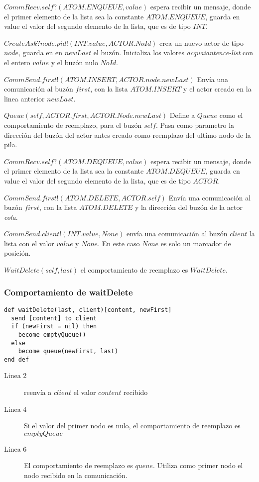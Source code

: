 \begin{description}
 \item $CommRecv.self?(ATOM.ENQUEUE, value)$ espera recibir un mensaje, donde el primer elemento de la lista sea la constante $ATOM.ENQUEUE$, guarda en value el valor del segundo elemento de la lista, que es de tipo $INT$.
 \item $CreateAsk?node.pid!(INT.value, ACTOR.NoId)$ crea un nuevo actor de tipo $node$, guarda en en $newLast$ el buzón. Inicializa los valores \textit{acquaiantence-list} con el entero $value$ y el buzón nulo $NoId$.
 \item $CommSend.first!(ATOM.INSERT, ACTOR.node.newLast)$ Envía una comunicación al buzón $first$, con la lista $ATOM.INSERT$ y el actor creado en la linea anterior $newLast$. 
 \item $Queue(self, ACTOR.first, ACTOR.Node.newLast)$ Define a $Queue$ como el comportamiento de reemplazo, para el buzón $self$. Pasa como parametro la dirección del buzón del actor antes creado como reemplazo del ultimo nodo de la pila.
 \item $CommRecv.self?(ATOM.DEQUEUE, value)$ espera recibir un mensaje, donde el primer elemento de la lista sea la constante $ATOM.DEQUEUE$, guarda en value el valor del segundo elemento de la lista, que es de tipo $ACTOR$.
 \item $CommSend.first!(ATOM.DELETE, ACTOR.self)$ Envía una comunicación al buzón $first$, con la lista $ATOM.DELETE$ y la dirección del buzón de la actor \textit{cola}. 
 \item $CommSend.client!(INT.value, None)$ envía una comunicación al buzón $client$ la lista con el valor $value$ y $None$. En este caso $None$ es solo un marcador de posición.
 \item $WaitDelete(self, last)$ el comportamiento de reemplazo es $WaitDelete$.
 \end{description}


\subsubsection*{Comportamiento de waitDelete}

\begin{lstlisting}[language=sal, style=simple]
def waitDelete(last, client)[content, newFirst]
  send [content] to client
  if (newFirst = nil) then
    become emptyQueue()
  else
    become queue(newFirst, last)
end def
\end{lstlisting}

\begin{description}
 \item [Linea 2] reenvía a $client$ el valor $content$ recibido
 \item [Linea 4] Si el valor del primer nodo es nulo, el comportamiento de reemplazo es $emptyQueue$
 \item [Linea 6] El comportamiento de reemplazo es $queue$. Utiliza como primer nodo el nodo recibido en la comunicación.
\end{description}

